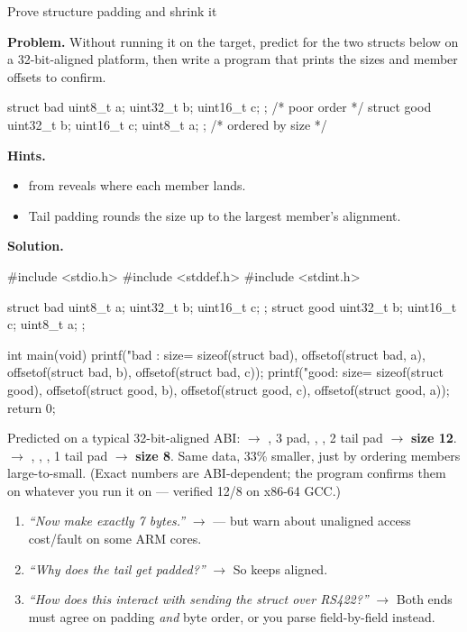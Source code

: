 \begin{gymproblem}{Prove structure padding and shrink it}

\textbf{Problem.} Without running it on the target, predict  for
the two structs below on a 32-bit-aligned platform, then write a program that
prints the sizes and member offsets to confirm.

\begin{cgym}
struct bad  { uint8_t a; uint32_t b; uint16_t c; };  /* poor order      */
struct good { uint32_t b; uint16_t c; uint8_t a; };  /* ordered by size */
\end{cgym}

\textbf{Hints.}
\begin{itemize}
\item {} from  reveals where each member lands.
\item Tail padding rounds the size up to the largest member's alignment.
\end{itemize}

\attempt

\textbf{Solution.}
\begin{cgym}
#include <stdio.h>
#include <stddef.h>
#include <stdint.h>

struct bad  { uint8_t a; uint32_t b; uint16_t c; };
struct good { uint32_t b; uint16_t c; uint8_t a; };

int main(void) {
    printf("bad : size=%
           sizeof(struct bad),
           offsetof(struct bad, a),
           offsetof(struct bad, b),
           offsetof(struct bad, c));
    printf("good: size=%
           sizeof(struct good),
           offsetof(struct good, b),
           offsetof(struct good, c),
           offsetof(struct good, a));
    return 0;
}
\end{cgym}

Predicted on a typical 32-bit-aligned ABI:  $\rightarrow$
, 3 pad, , , 2 tail pad $\rightarrow$
\textbf{size 12}.  $\rightarrow$ , ,
, 1 tail pad $\rightarrow$ \textbf{size 8}. Same data, 33\%
smaller, just by ordering members large-to-small. (Exact numbers are
ABI-dependent; the program confirms them on whatever you run it on ---
verified 12/8 on x86-64 GCC.)

\followups
\begin{enumerate}
\item \emph{``Now make  exactly 7 bytes.''} $\rightarrow$
   --- but warn about unaligned access
  cost/fault on some ARM cores.
\item \emph{``Why does the tail get padded?''} $\rightarrow$ So
   keeps  aligned.
\item \emph{``How does this interact with sending the struct over RS422?''}
  $\rightarrow$ Both ends must agree on padding \emph{and} byte order, or you
  parse field-by-field instead.
\end{enumerate}
\end{gymproblem}

